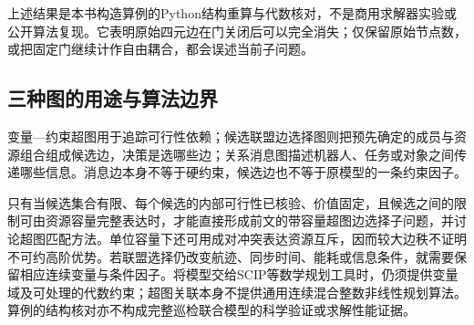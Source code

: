 上述结果是本书构造算例的Python结构重算与代数核对，不是商用求解器实验或公开算法复现。它表明原始四元边在门关闭后可以完全消失；仅保留原始节点数，或把固定门继续计作自由耦合，都会误述当前子问题。

\subsection{三种图的用途与算法边界}

变量—约束超图用于追踪可行性依赖；候选联盟边选择图则把预先确定的成员与资源组合组成候选边，决策是选哪些边；关系消息图描述机器人、任务或对象之间传递哪些信息。消息边本身不等于硬约束，候选边也不等于原模型的一条约束因子。

只有当候选集合有限、每个候选的内部可行性已核验、价值固定，且候选之间的限制可由资源容量完整表达时，才能直接形成前文的带容量超图边选择子问题，并讨论超图匹配方法\cite{GrossmannJRS2026,ReinstadtlerFPU2025}。单位容量下还可用成对冲突表达资源互斥，因而较大边秩不证明不可约高阶优势。若联盟选择仍改变航迹、同步时间、能耗或信息条件，就需要保留相应连续变量与条件因子。将模型交给SCIP等数学规划工具时，仍须提供变量域及可处理的代数约束\cite{SCIP100}；超图关联本身不提供通用连续混合整数非线性规划算法。算例的结构核对亦不构成完整巡检联合模型的科学验证或求解性能证据。
